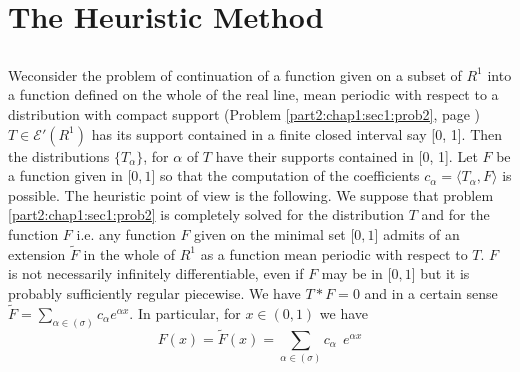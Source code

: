 
\chapter{The Heuristic Method}\label{part2:chap3} %

\section{}\label{part2:chap3:sec1}%

We\pageoriginale consider the problem of continuation of a function given on a
subset of $R^1$ into a function defined on the whole of the real line,
mean periodic with respect to a distribution with compact support
(Problem \ref{part2:chap1:sec1:prob2}, page \pageref{page69}) $T \in
\mathscr{E}' (R^1)$ has its support 
contained in a finite closed interval say [0, 1]. Then the
distributions $\{ T_\alpha \}$, for $\alpha$ of $T$ have their
supports contained in [0, 1]. Let $F$ be a function given in [$0,
  1$] so that the computation of the coefficients $c_\alpha = \langle
T_\alpha,  F \rangle $ is possible. The heuristic point of view is the
following. We suppose that problem \ref{part2:chap1:sec1:prob2} is completely solved for the
distribution $T$ and for the function $F$ i.e. any function $F$ given
on the minimal set [$0, 1$] admits of an extension $\tilde{F}$ in the
whole of $R^1$ as a function mean periodic with respect to $T$. $F$ is
not necessarily infinitely differentiable, even if $F$ may be in [$0,
  1$] but it is probably sufficiently regular piecewise. We have $T *
F = 0$ and in a certain sense $\tilde{F} = \sum\limits_{\alpha \in
  (\sigma) } c_\alpha e^{\alpha x}$. In particular, for $x \in (0, 1)$
we have  
\begin{equation*}
  F(x) = \tilde{F} (x) = \sum_{\alpha \in (\sigma )} c_\alpha ~~
  e^{\alpha x} \tag{1}\label{part2:chap3:sec1:eq1} 
\end{equation*}

